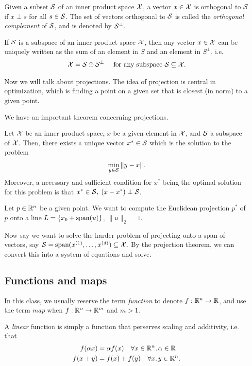 \documentclass[11 pt]{scrartcl}
\begin{document}
Given a subset $\mathcal S$ of an inner product space $\mathcal X$, a vector $x\in \mathcal X$ is orthogonal to $\mathcal S$ if $x\perp s$ for all $s\in \mathcal S$. 
The set of vectors orthogonal to $\mathcal S$ is called the \emph{orthogonal complement} of $\mathcal S$, and is denoted by $\mathcal S^\perp$. 

\begin{theorem}
    If $\mathcal S$ is a subspace of an inner-product space $\mathcal X$, then any vector $x\in \mathcal X$ can be uniquely written as the sum of an element in $S$ and an element in $S^\perp$, i.e. 
    \[ \mathcal X = \mathcal S \oplus \mathcal S^\perp \quad \text{ for any subspace } \mathcal S\subseteq \mathcal X.\]
\end{theorem}

Now we will talk about projections. 
The idea of projection is central in optimization, which is finding a point on a given set that is closest (in norm) to a given point. 


We have an important theorem concerning projections.
\begin{theorem}
    Let $\mathcal X$ be an inner product space, $x$ be a given element in $\mathcal X$, and $\mathcal S$ a subspace of $\mathcal X$. 
    Then, there exists a unique vector $x^*\in \mathcal S$ which is the solution to the problem 
    \[ \min_{y\in\mathcal S} \|y-x\|.\] 
    Moreover, a necessary and sufficient condition for $x^*$ being the optimal solution for this problem is that $x^*\in \mathcal S,\; (x-x^*)\perp \mathcal S$. 
\end{theorem}

Let $p\in \mathbb R^n$ be a given point. 
We want to compute the Euclidean projection $p^*$ of $p$ onto a line $L = \{x_0 + \text{span}(u)\}$, $\|u\|_2 = 1$. 

Now say we want to solve the harder problem of projecting onto a span of vectors, say $\mathcal S = \text{span}(x^{(1)}, \dots, x^{(d)})\subseteq \mathcal X$. 
By the projection theorem, we can convert this into a system of equations and solve. 


\subsection{Functions and maps}
In this class, we usually reserve the term \emph{function} to denote $f: \mathbb R^n\to \mathbb R$, and use the term \emph{map} when $f: \mathbb R^n \to \mathbb R^m$ and $m > 1$.

A \emph{linear} function is simply a function that perserves scaling and additivity, i.e. that 
\begin{align*}
    f(\alpha x) &= \alpha f(x) \quad\forall x\in \mathbb R^n, \alpha\in\mathbb R \\ 
    f(x + y) &= f(x) + f(y) \quad\forall x,y\in \mathbb R^n.
\end{align*}
\end{document}
